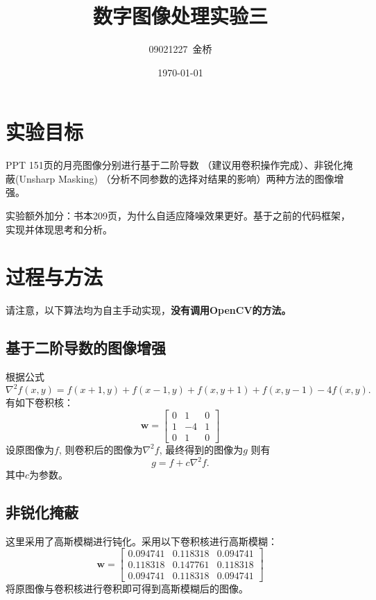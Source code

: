\documentclass{article}
\title{数字图像处理实验三}
\author{09021227~金桥}
\date{\today}
\begin{document}
\maketitle

\section{实验目标}

PPT 151页的月亮图像分别进行基于二阶导数 （建议用卷积操作完成）、非锐化掩蔽(Unsharp Masking) （分析不同参数的选择对结果的影响）两种方法的图像增强。


实验额外加分：书本209页，为什么自适应降噪效果更好。基于之前的代码框架，实现并体现思考和分析。
\section{过程与方法}

请注意，以下算法均为自主手动实现，\textbf{没有调用OpenCV的方法。}

\subsection{基于二阶导数的图像增强}

根据公式 $$\nabla^2f(x, y)=f(x+1, y)+f(x-1, y)+f(x, y+1)+f(x, y-1)-4f(x, y).$$ 有如下卷积核：
$$
    \mathbf{w}=\left[
        \begin{matrix}
            0 & 1  & 0 \\
            1 & -4 & 1 \\
            0 & 1  & 0
        \end{matrix}
        \right]
$$
设原图像为$f$, 则卷积后的图像为$\nabla^2f$, 最终得到的图像为$g$ 则有$$g=f+c\nabla^2f.$$ 其中$c$为参数。

\subsection{非锐化掩蔽}

这里采用了高斯模糊进行钝化。采用以下卷积核进行高斯模糊：
$$
    \mathbf{w}=\left[
        \begin{matrix}
            0.094741 & 0.118318 & 0.094741 \\
            0.118318 & 0.147761 & 0.118318 \\
            0.094741 & 0.118318 & 0.094741
        \end{matrix}
        \right]
$$
将原图像与卷积核进行卷积即可得到高斯模糊后的图像。
\end{document}
